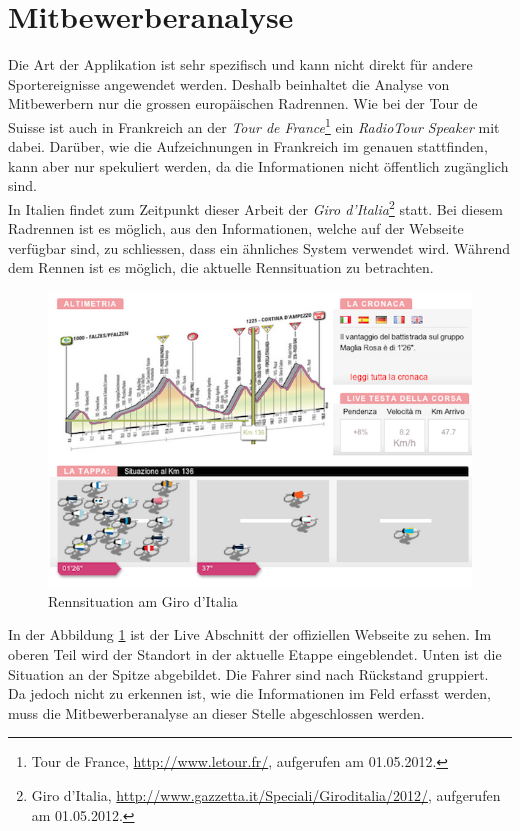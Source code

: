 \section{Mitbewerberanalyse}
Die Art der Applikation ist sehr spezifisch und kann nicht direkt für andere Sportereignisse angewendet werden. Deshalb beinhaltet die Analyse von Mitbewerbern nur die grossen europäischen Radrennen. Wie bei der Tour de Suisse ist auch in Frankreich an der \textit{Tour de France}\footnote{Tour de France, \url{http://www.letour.fr/}, aufgerufen am 01.05.2012.} ein \textit{RadioTour Speaker} mit dabei. Darüber, wie die Aufzeichnungen in Frankreich im genauen stattfinden, kann aber nur spekuliert werden, da die Informationen nicht öffentlich zugänglich sind.
\\

In Italien findet zum Zeitpunkt dieser Arbeit der \textit{Giro d'Italia}\footnote{Giro d'Italia,  \url{http://www.gazzetta.it/Speciali/Giroditalia/2012/}, aufgerufen am 01.05.2012.} statt. Bei diesem Radrennen ist es möglich, aus den Informationen, welche auf der Webseite verfügbar sind, zu schliessen, dass ein ähnliches System verwendet wird. Während dem Rennen ist es möglich, die aktuelle Rennsituation zu betrachten.

\begin{figure}[h!]
\caption{Rennsituation am Giro d'Italia}
\label{fig:giro}
\includegraphics[scale=0.7]{05bericht/images/giro.png}
\end{figure} 

In der Abbildung \ref{fig:giro} ist der Live Abschnitt der offiziellen Webseite zu sehen. Im oberen Teil wird der Standort in der aktuelle Etappe eingeblendet. Unten ist die Situation an der Spitze abgebildet. Die Fahrer sind nach Rückstand gruppiert.
\\

Da jedoch nicht zu erkennen ist, wie die Informationen im Feld erfasst werden, muss die Mitbewerberanalyse an dieser Stelle abgeschlossen werden.
